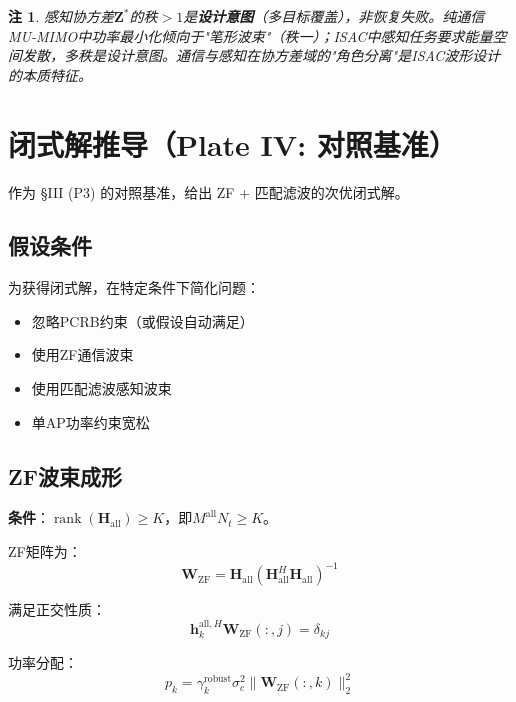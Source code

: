 \documentclass[12pt,a4paper]{article}
\newtheorem{remark}{注}
\newcommand{\vect}[1]{\mathbf{#1}}
\newcommand{\mat}[1]{\mathbf{#1}}
\newcommand{\norm}[1]{\|#1\|_2}
\DeclareMathOperator{\rank}{rank}
\begin{document}
\begin{remark}
感知协方差$\mat{Z}^*$的秩$>1$是\textbf{设计意图}（多目标覆盖），非恢复失败。纯通信MU-MIMO中功率最小化倾向于"笔形波束"（秩一）；ISAC中感知任务要求能量空间发散，多秩是设计意图。通信与感知在协方差域的"角色分离"是ISAC波形设计的本质特征。
\end{remark}

\section{闭式解推导（Plate IV: 对照基准）}

作为 §III (P3) 的对照基准，给出 ZF + 匹配滤波的次优闭式解。

\subsection{假设条件}

为获得闭式解，在特定条件下简化问题：
\begin{itemize}
    \item 忽略PCRB约束（或假设自动满足）
    \item 使用ZF通信波束
    \item 使用匹配滤波感知波束
    \item 单AP功率约束宽松
\end{itemize}

\subsection{ZF波束成形}

\textbf{条件}：$\rank(\mat{H}_{\text{all}}) \geq K$，即$M^{\text{all}} N_t \geq K$。

ZF矩阵为：
\begin{equation}
\mat{W}_{\text{ZF}} = \mat{H}_{\text{all}} (\mat{H}_{\text{all}}^H \mat{H}_{\text{all}})^{-1} \tag{20}
\end{equation}

满足正交性质：
\begin{equation}
\vect{h}_k^{\text{all},H} \mat{W}_{\text{ZF}}(:,j) = \delta_{kj}
\end{equation}

功率分配：
\begin{equation}
p_k = \gamma_k^{\text{robust}} \sigma_c^2 \norm{\mat{W}_{\text{ZF}}(:,k)}^2 \tag{21}
\end{equation}
\end{document}
